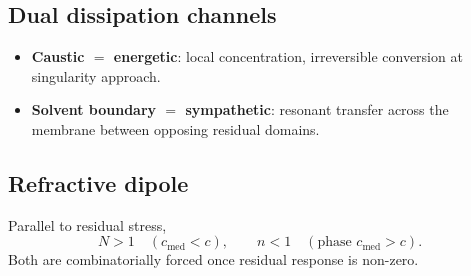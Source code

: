 \subsection{Dual dissipation channels}
\begin{itemize}
\item \textbf{Caustic $=$ energetic}: local concentration, irreversible conversion
at singularity approach.
\item \textbf{Solvent boundary $=$ sympathetic}: resonant transfer across the
membrane between opposing residual domains.
\end{itemize}

\subsection{Refractive dipole}
Parallel to residual stress,
\[
N>1\quad(c_{\mathrm{med}}<c),\qquad n<1\quad(\text{phase }c_{\mathrm{med}}>c).
\]
Both are combinatorially forced once residual response is non-zero.
